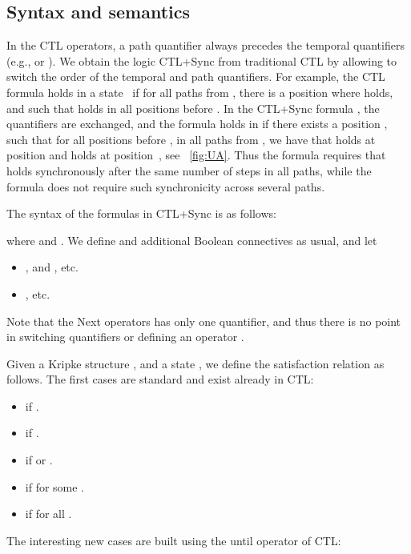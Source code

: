 \documentclass{article}
\begin{document}
\subsection{Syntax and semantics}\label{sec:ss}
In the CTL operators, a path quantifier always precedes the temporal quantifiers 
(e.g.,  or ). 
We obtain the logic CTL+Sync from traditional CTL by allowing to switch the order of
the temporal and path quantifiers. For example, the CTL formula 
holds in a state~ if for all  paths  from , there is a position
where  holds, and such that  holds in all positions before .
In the CTL+Sync formula , the quantifiers are exchanged, and
the formula holds in  if there exists a position , such that for all positions  before ,
in all paths  from , we have that  holds at position  and 
 holds at position~, see \figurename~\ref{fig:UA}.
Thus the formula  requires that  holds synchronously 
after the same number of steps in all paths, while the formula 
does not require such synchronicity across several paths.

The syntax of the formulas in CTL+Sync is as follows:

where  and .
We define  and additional Boolean connectives as usual, and let 
\begin{itemize}
\item , and , etc. 
\item , etc. 
\end{itemize}

Note that the Next operators  has only one quantifier,
and thus there is no point in switching quantifiers or defining
an operator .  

Given a Kripke structure , and a state , 
we define the satisfaction relation  as follows. The first cases
are standard and exist already in CTL:

\begin{itemize}
\item  if .

\item  if .

\item  if  or .

\item  if  for some .

\item  if  for all .
\end{itemize}

\noindent The interesting new cases are built using the until operator of CTL:
\end{document}
